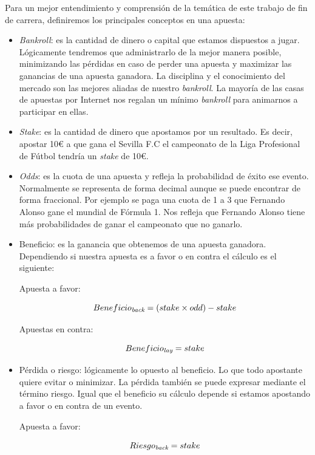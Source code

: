    Para un mejor entendimiento y comprensión de la temática de este trabajo de fin de carrera, definiremos los principales conceptos en una apuesta:
 \begin{itemize}
 \item \emph{Bankroll}: es la cantidad de dinero o capital  que estamos dispuestos a jugar. Lógicamente tendremos que administrarlo de la mejor manera posible, minimizando las pérdidas en caso de perder una apuesta y maximizar las ganancias de una apuesta ganadora. La disciplina y el conocimiento del mercado son las mejores aliadas de nuestro \emph{bankroll}. La mayoría de las casas de apuestas por Internet nos regalan un mínimo \emph{bankroll} para animarnos a participar en ellas.
 \item \emph{Stake}: es la cantidad de dinero que apostamos por un resultado. Es decir, apostar 10\euro{} a que gana el Sevilla F.C el campeonato de la Liga Profesional de Fútbol tendría un \emph{stake} de 10\euro.
 \item \emph{Odds}: es la cuota de una apuesta y refleja la probabilidad de éxito ese evento. Normalmente se representa de forma decimal aunque se puede encontrar de forma fraccional. Por ejemplo se paga una cuota de 1 a 3 que Fernando Alonso gane el mundial de Fórmula 1. Nos refleja que Fernando Alonso tiene más probabilidades de ganar el campeonato que no ganarlo.
 \item Beneficio: es la ganancia que obtenemos de una apuesta ganadora. Dependiendo si nuestra apuesta es a favor o en contra el cálculo es el siguiente:
 
 	Apuesta a favor:
	
 \begin{displaymath}
 Beneficio_\emph{back} = (stake \times odd) - stake  
\end{displaymath}

	Apuestas en contra:
	
 \begin{displaymath}
 Beneficio_\emph{lay}  =  stake  
\end{displaymath}

\item Pérdida o riesgo: lógicamente lo opuesto al beneficio. Lo que todo apostante quiere evitar o minimizar. La pérdida también se puede expresar mediante el término riesgo. Igual que el beneficio su cálculo depende si estamos apostando a favor o en contra de un evento.

	Apuesta a favor:
	
 \begin{displaymath}
 Riesgo_\emph{back} = stake  
\end{displaymath}
	

\end{itemize}
